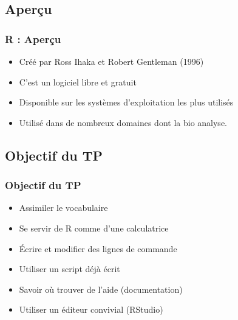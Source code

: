 \documentclass[table,svgnames,hyperref={pdfpagemode=FullScreen}]{beamer}
\begin{document}
\subsection{Aperçu}

\begin{frame}
	\frametitle{R : Aperçu}
	\begin{center}
		\begin{block}{}
			\begin{itemize}
				\item Créé par Ross Ihaka et Robert Gentleman (1996)
				\item C'est un logiciel libre et gratuit
				\item Disponible sur les systèmes d'exploitation les plus utilisés
				\item Utilisé dans de nombreux domaines dont la bio analyse.
			\end{itemize}
		\end{block}
	\end{center}
\end{frame}

\subsection{Objectif du TP}
\begin{frame}
	\frametitle{Objectif du TP}
		
	\begin{itemize}[<+->]
		\item {Assimiler le vocabulaire }
		\item {Se servir de R comme d'une calculatrice}
		\item {Écrire et modifier des lignes de commande}
		\item {Utiliser un script déjà écrit}
		\item {Savoir où trouver de l'aide (documentation)}
		\item {Utiliser un éditeur convivial (RStudio)}%
	\end{itemize}
\end{frame}
\end{document}
